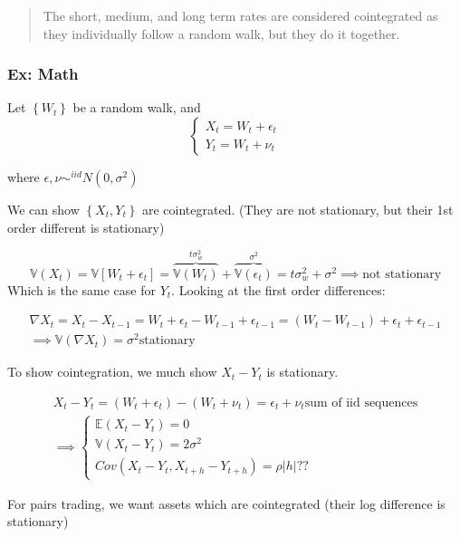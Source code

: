 \documentclass[
  oneside]{book}
\begin{document}
\begin{quote}
The short, medium, and long term rates are considered cointegrated as they individually follow a random walk, but they do it together.
\end{quote}

\hypertarget{ex-math}{%
\subsubsection{Ex: Math}\label{ex-math}}

Let \(\left\{ W_{t} \right\}\) be a random walk, and
\[
\begin{cases}
X_{t} = W_{t} + \epsilon_{t} \\
Y_{t} = W_{t} + \nu_{t}
\end{cases}
\]

where \(\epsilon, \nu \sim^{iid} N(0,\sigma^{2})\)

We can show \(\left\{ X_{t},Y_{t} \right\}\) are cointegrated. (They are not stationary, but their 1st order different is stationary)

\[
\mathbb{V}(X_{t}) = \mathbb{V}[W_{t}+\epsilon_{t}] = \overbrace{ \mathbb{V}(W_{t}) }^{ t \sigma_{w}^{2} } + \overbrace{ \mathbb{V}(\epsilon_{t}) }^{ \sigma^{2} } = t\sigma_{w}^{2}+\sigma^{2} \implies \text{not stationary}
\]
Which is the same case for \(Y_{t}\). Looking at the first order differences:

\[
\begin{gathered}
\nabla X_{t} = X_{t}-X_{t-1} = W_{t}+\epsilon_{t} -W_{t-1}+\epsilon_{t-1} = (W_{t}-W_{t-1})+\epsilon_{t}+\epsilon_{t-1}\\
\implies \mathbb{V}(\nabla X_{t}) = \sigma^{2} \text{stationary}
\end{gathered}
\]

To show cointegration, we much show \(X_{t}-Y_{t}\) is stationary.

\[
\begin{gathered}
X_{t}-Y_{t} = (W_{t}+\epsilon_{t})-(W_{t}+\nu_{t}) = \epsilon_{t} + \nu_{t} \text{sum of iid sequences}\\
\implies \begin{cases}
\mathbb{E}(X_{t}-Y_{t}) = 0 \\
\mathbb{V}(X_{t}-Y_{t}) = 2\sigma^{2} \\
Cov(X_{t}-Y_{t}, X_{t+h}-Y_{t+h}) = \rho |h| ??
\end{cases}
\end{gathered}
\]

For pairs trading, we want assets which are cointegrated (their log difference is stationary)
\end{document}
